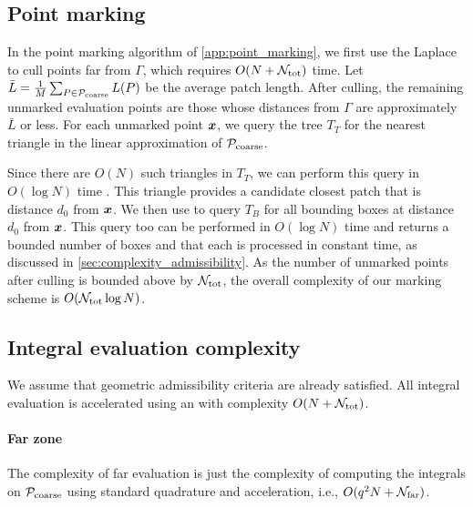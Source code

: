 
\subsection{Point marking\label{sec:complexity-point-marking}}
In the point marking algorithm of \cref{app:point_marking}, we first use the Laplace \fmm to cull points far from $\Gamma$, which requires $O(N+\mathcal{N}_{\mathrm{tot}})$ time. 
Let $\bar{L} = \frac{1}{M}\sum_{P \in {\mathcal{P}_{\ensuremath{\mathrm{coarse}}}}}L(P)$ be the average patch length.
After \fmm culling, the remaining unmarked evaluation points are those whose distances from $\Gamma$ are approximately $\bar{L}$ or less.  For each unmarked point ${\bm{x}}$,  we query the \aabb tree $T_T$ for the nearest triangle in the linear approximation of ${\mathcal{P}_{\mathrm{coarse}}}$.

Since there are $O(N)$ such triangles in $T_T$, we can perform this query in $O(\log N)$ time \cite{samet2006foundations}.
This triangle provides a candidate closest patch that is distance $d_0$ from ${\bm{x}}$. 
We then use to query $T_B$ for all bounding boxes at distance $d_0$ from ${\bm{x}}$.  
This query too can be performed in $O(\log N)$ time \cite{samet2006foundations} and returns a bounded number of boxes and that each is processed in constant time, as discussed in \cref{sec:complexity_admissibility}.
As the number of unmarked points after culling is bounded above by $\mathcal{N}_{\mathrm{tot}}$, the overall complexity of our marking scheme is $O(\mathcal{N}_{\mathrm{tot}} \log N)$.


\subsection{Integral evaluation complexity \label{sec:complexity_matvec}}
We assume that geometric admissibility criteria are already satisfied. 
All integral evaluation is accelerated using an \fmm with complexity $O(N + \mathcal{N}_{\mathrm{tot}})$. 
\paragraph{Far zone}  The complexity of far evaluation is just the complexity of computing the integrals on ${\mathcal{P}_{\mathrm{coarse}}}$ using standard quadrature and \fmm acceleration, i.e.,  $O(q^2N + \mathcal{N}_{\mathrm{far}})$.%

